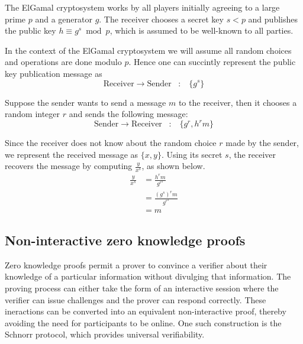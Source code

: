 The ElGamal cryptosystem works by all players initially agreeing to a large prime $p$
and a generator $g$.  The receiver chooses a secret key $s < p$ and publishes
the public key $h \equiv g^s \bmod p$, which is assumed to be well-known to
all parties.

In the context of the ElGamal cryptosystem
we will assume all random choices and operations are done
modulo $p$.  Hence one can succintly represent the
public key publication message as
\[
\text{Receiver} \rightarrow \text{Sender} \hspace{10pt} : \hspace{10pt} \{g^s\}  
\]

Suppose the sender wants to send a message $m$ to the receiver, then it chooses
a random integer $r$ and sends the following message:
\[
\text{Sender} \rightarrow \text{Receiver} \hspace{10pt} : \hspace{10pt} \{g^r, h^rm\}
\]

Since the receiver does not know about the random choice $r$ made by the sender, we
represent the received message as $\{x, y\}$.  Using its secret $s$, the receiver recovers
the message by computing $\frac{y}{x^s}$, as shown below.
\begin{equation} \label{eq1}
\begin{split}
\frac{y}{x^s} & = \frac{h^rm}{g^{r^s}} \\
              & = \frac{{{(g^s)}^r}m}{g^{r^s}}\\
              & = m
\end{split}
\end{equation}

\subsection{Non-interactive zero knowledge proofs}

Zero knowledge proofs permit a prover to convince a verifier about their knowledge
of a particular information without divulging that information.  The proving
process can either take the form of an interactive session where the verifier
can issue challenges and the prover can respond correctly.  These ineractions can
be converted into an equivalent non-interactive proof,
thereby avoiding the need for participants
to be online.  One such construction is the Schnorr protocol, which 
provides universal verifiability.

